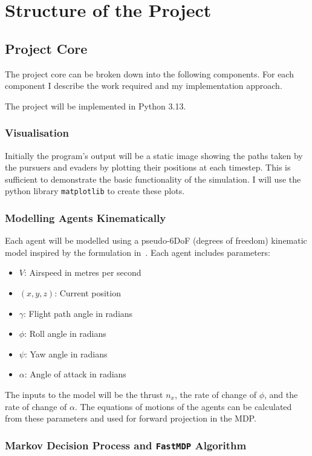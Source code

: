 \documentclass[12pt,a4paper,twoside]{article}
\begin{document}
\section{Structure of the Project}

\subsection*{Project Core}

The project core can be broken down into the following components. For each component I describe the work required and my implementation approach.

The project will be implemented in Python 3.13.

\subsubsection*{Visualisation}

Initially the program's output will be a static image showing the paths taken by the pursuers and evaders by plotting their positions at each timestep. This is sufficient to demonstrate the basic functionality of the simulation. I will use the python library \texttt{matplotlib} to create these plots.

\subsubsection*{Modelling Agents Kinematically}

Each agent will be modelled using a pseudo-6DoF (degrees of freedom) kinematic model inspired by the formulation in~\cite{BertramWei2021}. Each agent includes parameters:
\begin{itemize}
  \item $V$: Airspeed in metres per second
  \item $(x, y, z)$: Current position
  \item $\gamma$: Flight path angle in radians
  \item $\phi$: Roll angle in radians
  \item $\psi$: Yaw angle in radians
  \item $\alpha$: Angle of attack in radians
\end{itemize}
The inputs to the model will be the thrust $n_x$, the rate of change of $\phi$, and the rate of change of $\alpha$. The equations of motions of the agents can be calculated from these parameters and used for forward projection in the MDP\@.
\subsubsection*{Markov Decision Process and \texttt{FastMDP} Algorithm}
\end{document}
